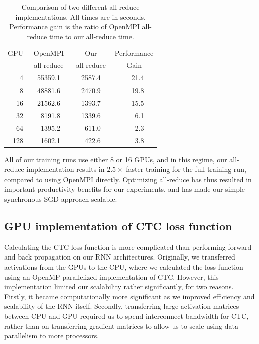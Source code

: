 \documentclass{article}
\begin{document}
\begin{table}
\centering
\begin{tabular}{r  r r r  r r r  r r r}
\toprule
GPU & \multicolumn{3}{c}{OpenMPI} & \multicolumn{3}{c}{Our} & \multicolumn{3}{c}{Performance} \\
    & \multicolumn{3}{c}{all-reduce} & \multicolumn{3}{c}{all-reduce} & \multicolumn{3}{c}{Gain}        \\
\midrule
4   & & 55359.1 & & & 2587.4 & & & 21.4 &  \\
8   & & 48881.6 & & & 2470.9 & & & 19.8 &  \\
16  & & 21562.6 & & & 1393.7 & & & 15.5 &  \\
32  & & 8191.8  & & & 1339.6 & & & 6.1  &  \\
64  & & 1395.2  & & & 611.0  & & & 2.3  &  \\
128 & & 1602.1  & & & 422.6  & & & 3.8  &  \\
\bottomrule
\end{tabular}
\caption{Comparison of two different all-reduce implementations. All times are in seconds. Performance gain is the ratio of OpenMPI all-reduce time to our all-reduce time.}
\label{table:compare-allreduce}
\end{table}

All of our training runs use either 8 or 16 GPUs, and in this regime, our all-reduce implementation results in $2.5\times$ faster training for the full training run, compared to using OpenMPI directly. Optimizing all-reduce has thus resulted in important productivity benefits for our experiments, and has made our simple synchronous SGD approach scalable.

\subsection{GPU implementation of CTC loss function}

Calculating the CTC loss function is more complicated than performing forward and back propagation on our RNN architectures. Originally, we transferred activations from the GPUs to the CPU, where we calculated the loss function using an OpenMP parallelized implementation of CTC. However, this implementation limited our scalability rather significantly, for two reasons. Firstly, it became computationally more significant as we improved efficiency and scalability of the RNN itself. Secondly, transferring large activation matrices between CPU and GPU required us to spend interconnect bandwidth for CTC, rather than on transferring gradient matrices to allow us to scale using data parallelism to more processors.
\end{document}
